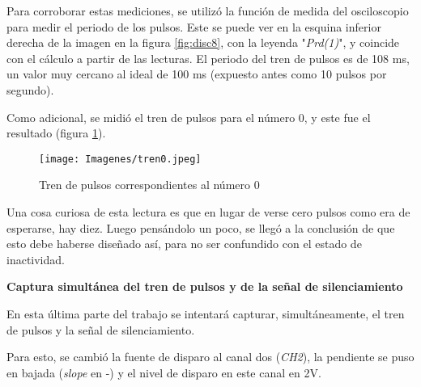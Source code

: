 \begin{table}[H]
    \centering
        \def\tablename{Tabla} 
        \caption{Tiempos del tren de pulsos}
        \label{tab:durPul}
\end{table}

Para corroborar estas mediciones, se utilizó la función de medida del osciloscopio para medir el periodo de los pulsos. Este se puede ver en la esquina inferior derecha de la imagen en la figura \ref{fig:disc8}, con la leyenda "\textit{Prd(1)}", y coincide con el cálculo a partir de las lecturas. El periodo del tren de pulsos es de 108 ms, un valor muy cercano al ideal de 100 ms (expuesto antes como 10 pulsos por segundo). 

Como adicional, se midió el tren de pulsos para el número 0, y este fue el resultado (figura \ref{fig:disc0}). 

\begin{figure}[H]
    \centering
        \texttt{[image: Imagenes/tren0.jpeg]}
    \caption{Tren de pulsos correspondientes al número $0$}
    \label{fig:disc0}
\end{figure}

Una cosa curiosa de esta lectura es que en lugar de verse cero pulsos como era de esperarse, hay diez. Luego pensándolo un poco, se llegó a la conclusión de que esto debe haberse diseñado así, para no ser confundido con el estado de inactividad. 



\vspace{10mm}
\textbf{Captura simultánea del tren de pulsos y de la señal de silenciamiento}
\vspace{3mm}

En esta última parte del trabajo se intentará capturar, simultáneamente, el tren de pulsos y la señal de silenciamiento.

Para esto, se cambió la fuente de disparo al canal dos (\textit{CH2}), la pendiente se puso en bajada (\textit{slope} en -) y el nivel de disparo en este canal en 2V. 

